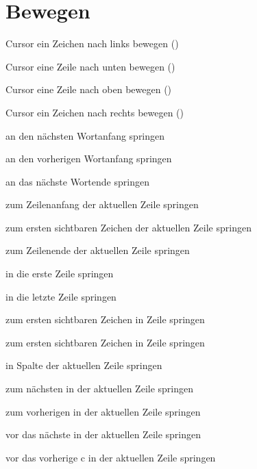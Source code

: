 \documentclass
[
  draft    = true,
  fontsize = 11pt,
  parskip  = half,
  BCOR     = 0pt,
  DIV      = calc,
  ngerman
]
{scrartcl}
\begin{document}
\section{Bewegen}
\begin{mytemize}
  \renewcommand{\cmdwidth}{5em}%
  \item {}          Cursor ein Zeichen nach links bewegen (\makebox[1em][c]{$\leftarrow$})
  \item {}          Cursor eine Zeile nach unten bewegen (\makebox[1em][c]{$\downarrow$})
  \item {}          Cursor eine Zeile nach oben bewegen (\makebox[1em][c]{$\uparrow$})
  \item {}          Cursor ein Zeichen nach rechts bewegen (\makebox[1em][c]{$\rightarrow$})
  \item {}          an den nächsten Wortanfang springen
  \item {}          an den vorherigen Wortanfang springen
  \item {}          an das nächste Wortende springen
  \item {}          zum Zeilenanfang der aktuellen Zeile springen
  \item \vimcmd{}{\^}{}         zum ersten sichtbaren Zeichen der aktuellen Zeile springen
  \item \vimcmd{}{\$}{}         zum Zeilenende der aktuellen Zeile springen
  \item {}         in die erste Zeile springen
  \item {}          in die letzte Zeile springen
  \item {}        zum ersten sichtbaren Zeichen in Zeile  springen
  \item {}         zum ersten sichtbaren Zeichen in Zeile  springen
  \item {}         in Spalte  der aktuellen Zeile springen
  \item {}         zum nächsten  in der aktuellen Zeile springen
  \item {}         zum vorherigen  in der aktuellen Zeile springen
  \item {}         vor das nächste  in der aktuellen Zeile springen
  \item {}         vor das vorherige c in der aktuellen Zeile springen

\end{mytemize}
\end{document}
